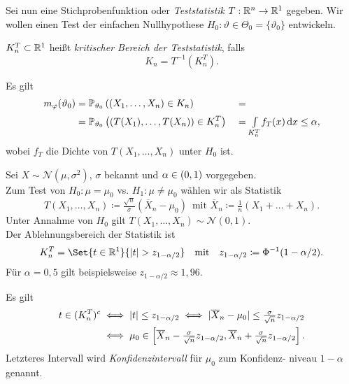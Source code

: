 \documentclass{cheat-sheet}
\renewcommand{\P}{\mathbb{P}} %
\newcommand{\Normal}{\mathcal{N}} %
\begin{document}

\begin{situation}
  Sei nun eine Stichprobenfunktion oder \emph{Teststatistik} $T : \mathbb{R}^n \to \mathbb{R}^1$ gegeben.
  Wir wollen einen Test der einfachen Nullhypothese $H_0 : \vartheta \in \Theta_0 = \{ \vartheta_0 \}$ entwickeln.
\end{situation}

\begin{defn}
  $K_n^T \subset \mathbb{R}^1$ heißt \emph{kritischer Bereich der Teststatistik}, falls
  \[ K_n = T^{-1}(K_n^T). \]
\end{defn}

\begin{bem}
  Es gilt
  \begin{alignat*}{4}
    m_\varphi(\vartheta_0) &= \P_{\vartheta_0} \left( (X_1, \ldots, X_n) \in K_n \right)
    &&= \\
    &= \P_{\vartheta_0} \left( (T(X_1), \ldots, T(X_n)) \in K_n^T \right)
    &&= \Int{K_n^T}{}{f_T(x)}{x} \leq \alpha,
  \end{alignat*}
  wobei $f_T$ die Dichte von $T(X_1, \ldots, X_n)$ unter $H_0$ ist.
\end{bem}

\begin{bsp}
  Sei $X \sim \Normal(\mu, \sigma^2)$, $\sigma$ bekannt und $\alpha \in \left( 0, 1 \right)$ vorgegeben. \\
  Zum Test von $H_0 : \mu = \mu_0$ vs. $H_1 : \mu \neq \mu_0$ wählen wir als Statistik
  \[
    T(X_1, \ldots, X_n) \coloneqq \tfrac{\sqrt{n}}{\sigma} \left( \overline{X}_n - \mu_0 \right) \enspace
    \text{mit }
    \overline{X}_n \coloneqq \tfrac{1}{n} \left( X_1 + \ldots + X_n \right).
  \]
  Unter Annahme von $H_0$ gilt $T(X_1, \ldots, X_n) \sim \Normal(0,1)$. \\
  Der Ablehnungsbereich der Statistik ist
  \[
    K_n^T = \Set{t \in \R^1}{\abs{t} > z_{1 - \alpha/2}}
    \quad \text{mit} \quad
    z_{1 - \alpha/2} \coloneqq \Phi^{-1}(1 - \alpha/2).
  \]
  Für $\alpha = 0,5$ gilt beispielsweise $z_{1 - \alpha/2} \approx 1,96$.
\end{bsp}


\begin{bem}
  Es gilt
  \begin{align*}
    t \in (K_n^T)^c
    &\iff \lvert t\rvert \leq z_{1-\alpha/2}
    \iff \lvert\overline{X}_n - \mu_0\rvert \leq \tfrac{\sigma}{\sqrt{n}} z_{1-\alpha/2} \\
    &\iff \mu_0 \in \left[ \overline{X}_n - \tfrac{\sigma}{\sqrt{n}} z_{1-\alpha/2}, \overline{X}_n + \tfrac{\sigma}{\sqrt{n}} z_{1-\alpha/2} \right].
  \end{align*}
  Letzteres Intervall wird \emph{Konfidenzintervall} für $\mu_0$ zum Konfidenz- niveau $1-\alpha$ genannt.
\end{bem}
\end{document}
